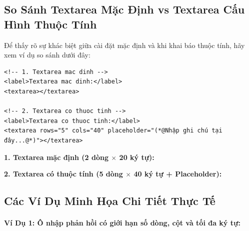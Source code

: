 \subsection{So Sánh Textarea Mặc Định vs Textarea Cấu Hình Thuộc Tính}

Để thấy rõ sự khác biệt giữa cài đặt mặc định và khi khai báo thuộc tính, hãy xem ví dụ so sánh dưới đây:

\begin{codeWindow}
\begin{lstlisting}[language=HTML5]
<!-- 1. Textarea mac dinh -->
<label>Textarea mac dinh:</label>
<textarea></textarea>

<!-- 2. Textarea co thuoc tinh -->
<label>Textarea co thuoc tinh:</label>
<textarea rows="5" cols="40" placeholder="(*@Nhập ghi chú tại đây...@*)"></textarea>
\end{lstlisting}
\end{codeWindow}

\begin{browserWindow}
\sffamily\small
\textbf{1. Textarea mặc định (2 dòng $\times$ 20 ký tự):} \par\vspace{4pt}
\tcbox[arc=2pt, colback=white, colframe=primaryBlue!40, boxsep=2pt, width=0.45\linewidth, height=30pt]{} \par\vspace{8pt}

\textbf{2. Textarea có thuộc tính (5 dòng $\times$ 40 ký tự + Placeholder):} \par\vspace{4pt}
\end{browserWindow}

\subsection{Các Ví Dụ Minh Họa Chi Tiết Thực Tế}

\paragraph{Ví Dụ 1: Ô nhập phản hồi có giới hạn số dòng, cột và tối đa ký tự:}

